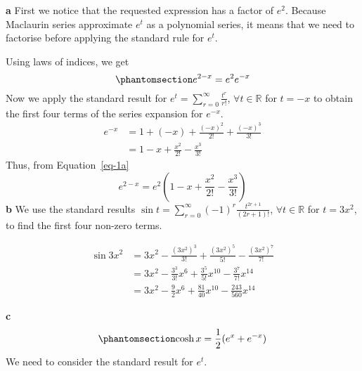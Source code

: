 \documentclass[
  a4paper,
]{report}
\begin{document}
\begin{tcolorbox}[enhanced jigsaw, leftrule=.75mm, left=2mm, opacitybacktitle=0.6, breakable, bottomtitle=1mm, colframe=quarto-callout-tip-color-frame, opacityback=0, colbacktitle=quarto-callout-tip-color!10!white, toptitle=1mm, arc=.35mm, titlerule=0mm, coltitle=black, rightrule=.15mm, bottomrule=.15mm, toprule=.15mm, title={Solution}, colback=white]

\textbf{a} First we notice that the requested expression has a factor of
\(e^2\). Because Maclaurin series approximate \(e^t\) as a polynomial
series, it means that we need to factorise before applying the standard
rule for \(e^t\).

Using laws of indices, we get
\begin{equation}\phantomsection\label{eq-4a}{e^{2-x}=e^2e^{-x}}\end{equation}
Now we apply the standard result for
\(e^t=\sum_{r=0}^\infty\frac{t^r}{r!}\), \(\forall t\in \mathbb{R}\) for
\(t=-x\) to obtain the first four terms of the series expansion for
\(e^{-x}\). \begin{equation*}
\begin{split}
e^{-x}&=1+(-x)+\frac{(-x)^2}{2!}+\frac{(-x)^3}{3!} \\
&=1-x+\frac{x^2}{2!}-\frac{x^3}{3!}
\end{split}
\end{equation*} Thus, from Equation~\ref{eq-1a}
\[e^{2-x}=e^2\left(1-x+\frac{x^2}{2!}-\frac{x^3}{3!}\right)\] \textbf{b}
We use the standard results
\(\sin t = \sum_{r=0}^\infty (-1)^r \frac{t^{2r+1}}{(2r+1)!}\),
\(\forall t \in \mathbb{R}\) for \(t=3x^2\), to find the first four
non-zero terms.

\begin{equation*}
\begin{split}
\sin 3x^2 &= 3x^2 - \frac{(3x^2)^3}{3!}+ \frac{(3x^2)^5}{5!}-\frac{(3x^2)^7}{7!} \\
&=3x^2 -\frac{3^3}{3!}x^6+\frac{3^5}{5!}x^10-\frac{3^7}{7!}x^14 \\
&=3x^2 -\frac{9}{2}x^6+\frac{81}{40}x^10-\frac{243}{560}x^14
\end{split}
\end{equation*}

\textbf{c}\\
\begin{equation}\phantomsection\label{eq-4b}{\cosh x = \frac{1}{2}(e^x+e^{-x})}\end{equation}
We need to consider the standard result for \(e^t\).


\end{tcolorbox}
\end{document}
